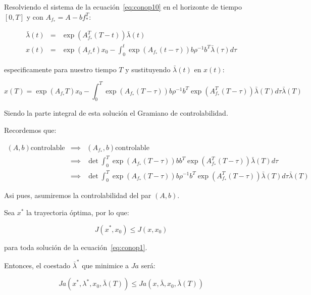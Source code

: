             Resolviendo el sistema de la ecuación~\ref{eq:conop10} en el horizonte de tiempo $[0, T]$ y con $A_{f_*} = A - b f_*^T$:

            \begin{eqnarray}
                \bar{\lambda}(t) & = & \exp{(A_{f_*}^T (T - t))} \bar{\lambda}(t) \\
                x(t) & = & \exp{(A_{f_*} t)} x_0 - \int_0^t \exp{(A_{f_*}(t - \tau))} b \rho^{-1} b^T \bar{\lambda}(\tau) d\tau \nonumber
            \end{eqnarray}

            especificamente para nuestro tiempo $T$ y sustituyendo $\bar{\lambda}(t)$ en $x(t)$:

            \begin{equation*}
                x(T) = \exp{(A_{f_*} T)} x_0 - \int_0^T \exp{(A_{f_*}(T - \tau))} b \rho^{-1} b^T \exp{(A_{f_*}^T (T - \tau))} \bar{\lambda}(T) d\tau \bar{\lambda}(T)
            \end{equation*}

            Siendo la parte integral de esta solución el Gramiano de controlabilidad.

            Recordemos que:

            \begin{eqnarray*}
                (A, b) \text{controlable} & \implies & (A_{f_*}, b) \text{controlable} \\
                & \implies & \det{\int_0^T \exp{(A_{f_*}(T - \tau))} b b^T \exp{(A_{f_*}^T (T - \tau))} \bar{\lambda}(T) d\tau} \\
                & \implies & \det{\int_0^T \exp{(A_{f_*}(T - \tau))} b \rho^{-1} b^T \exp{(A_{f_*}^T (T - \tau))} \bar{\lambda}(T) d\tau \bar{\lambda}(T)}
            \end{eqnarray*}

            Asi pues, asumiremos la controlabilidad del par $(A, b)$.

            Sea $x^*$ la trayectoria óptima, por lo que:

            \begin{equation*}
                J(x^*, x_0) \le J(x, x_0)
            \end{equation*}

            para toda solución de la ecuación~\ref{eq:conop1}.

            Entonces, el coestado $\bar{\lambda}^*$ que minimice a $Ja$ será:

            \begin{equation*}
                Ja(x^*, \lambda^*, x_0, \bar{\lambda}(T)) \le Ja(x, \bar{\lambda}, x_0, \bar{\lambda}(T))
            \end{equation*}

